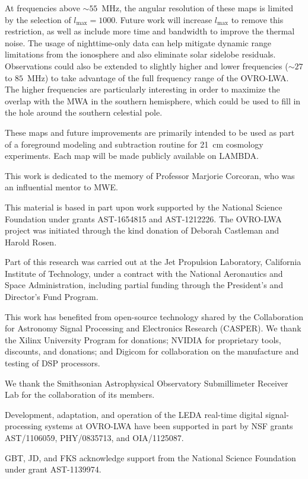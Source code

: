 \documentclass[twocolumn]{aastex61}
\begin{document}
At frequencies above $\sim55$~MHz, the angular resolution of these maps is limited by the selection
of $l_\text{max}=1000$. Future work will increase $l_\text{max}$ to remove this restriction, as well
as include more time and bandwidth to improve the thermal noise. The usage of nighttime-only data
can help mitigate dynamic range limitations from the ionosphere and also eliminate solar sidelobe
residuals. Observations could also be extended to slightly higher and lower frequencies ($\sim27$ to
$85$~MHz) to take advantage of the full frequency range of the OVRO-LWA. The higher frequencies are
particularly interesting in order to maximize the overlap with the MWA in the southern hemisphere,
which could be used to fill in the hole around the southern celestial pole.

These maps and future improvements are primarily intended to be used as part of a foreground
modeling and subtraction routine for 21~cm cosmology experiments. Each map will be made publicly
available on LAMBDA.

\acknowledgments
This work is dedicated to the memory of Professor Marjorie Corcoran, who was an influential mentor
to MWE.

This material is based in part upon work supported by the National Science Foundation under grants
AST-1654815 and AST-1212226. The OVRO-LWA project was initiated through the kind donation of Deborah
Castleman and Harold Rosen.

Part of this research was carried out at the Jet Propulsion Laboratory, California Institute of
Technology, under a contract with the National Aeronautics and Space Administration, including
partial funding through the President's and Director's Fund Program.

This work has benefited from open-source technology shared by the Collaboration for Astronomy Signal
Processing and Electronics Research (CASPER).  We thank the Xilinx University Program for donations;
NVIDIA for proprietary tools, discounts, and donations; and Digicom for collaboration on the
manufacture and testing of DSP processors.

We thank the Smithsonian Astrophysical Observatory Submillimeter Receiver Lab for the collaboration
of its members.

Development, adaptation, and operation of the LEDA real-time digital signal-processing systems at
OVRO-LWA have been supported in part by NSF grants AST/1106059, PHY/0835713, and OIA/1125087.

GBT, JD, and FKS acknowledge support from the National Science Foundation under grant AST-1139974.



\end{document}

